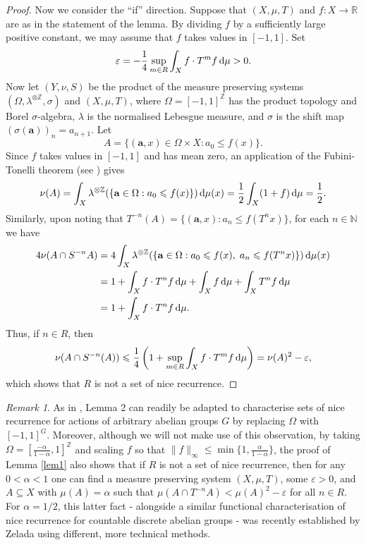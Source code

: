 \documentclass[reqno,a4paper,12pt]{amsart}
\theoremstyle{definition}
\theoremstyle{remark}
\newtheorem*{remark*}{Remark}
\def\d{{\,{\rm d}}}
\def \ba {\mathbf a}
\def \N {\mathbb{N}}
\def \R {\mathbb{R}}
\def \Z {\mathbb{Z}}
\def\eps{\varepsilon}
\begin{document}
\begin{proof}
    Now we consider the ``if'' direction. Suppose that $(X,\mu,T)$ and $f:X\to\R$ are as in the statement of the lemma. By dividing $f$ by a sufficiently large positive constant, we may assume that $f$ takes values in $[-1,1]$. Set
    \begin{equation*}
        \eps = -\frac{1}{4}\sup_{m\in R}\int_X f\cdot T^m f\d\mu > 0.
    \end{equation*}
    Now let $(Y,\nu,S)$ be the product of the measure preserving systems $(\Omega,\lambda^{\otimes\Z},\sigma)$ and $(X,\mu,T)$, where $\Omega = [-1,1]^{\Z}$ has the product topology and Borel $\sigma$-algebra, $\lambda$ is the normalised Lebesgue measure, and $\sigma$ is the shift map $(\sigma(\ba))_n = a_{n+1}$. Let
    \begin{equation*}
       A = \{(\ba,x)\in\Omega\times X: a_0\leqslant f(x)\}.
    \end{equation*}
        Since $f$ takes values in $[-1,1]$ and has mean zero, an application of the Fubini-Tonelli theorem (see \cite[Theorem 1.7.15]{Tao2011}) gives
    \begin{equation*}
        \nu(A) = \int_X \lambda^{\otimes\Z}(\{\ba\in\Omega:a_0\leqslant f(x)\})\d\mu(x) = \frac{1}{2}\int_X(1+f)\d\mu = \frac{1}{2}.
    \end{equation*}
    Similarly, upon noting that $T^{-n}(A) = \{(\ba,x): a_n\leqslant f(T^n x)\}$, for each $n\in\N$ we have
    \begin{align*}
        4\nu(A\cap S^{-n}A) &= 4\int_X \lambda^{\otimes\Z}(\{\ba\in\Omega:a_0\leqslant f(x),\; a_n\leqslant f(T^n x)\})\d\mu(x)\\
        &= 1 + \int_X f\cdot T^n f\d\mu + \int_X f \d\mu + \int_X T^n f\d \mu\\
        &= 1 + \int_X f\cdot T^n f \d\mu.
    \end{align*}
    Thus, if $n\in R$, then
    \begin{equation*}
        \nu(A\cap S^{-n}(A)) \leqslant \frac{1}{4}\left(1 + \sup_{m\in R}\int_X f\cdot T^m f\d\mu \right)= \nu(A)^2 - \eps,
    \end{equation*}
    which shows that $R$ is not a set of nice recurrence.
\end{proof}

\begin{remark*}
As in \cite{BTZ2015}, Lemma 2 can readily be adapted to characterise sets of nice recurrence for actions of arbitrary abelian groups $G$ by replacing $\Omega$ with  $[-1,1]^G$. Moreover, although we will not make use of this observation, by taking $\Omega=[\frac{-\alpha}{1-\alpha},1]^\Z$ and scaling $f$ so that $\lVert f\rVert_\infty\leqslant \min\{1,\frac{\alpha}{1-\alpha}\}$, the proof of Lemma \ref{lem1} also shows that if $R$ is not a set of nice recurrence, then for any $0<\alpha<1$ one can find a measure preserving system $(X,\mu,T)$, some $\eps>0$, and $A\subseteq X$ with $\mu(A)=\alpha $ such that $\mu(A\cap T^{-n}A)<\mu(A)^2 - \eps$ for all $n\in R$. For $\alpha = 1/2$, this latter fact - alongside a similar functional characterisation of nice recurrence for countable discrete abelian groups - was recently established by Zelada \cite[Appendix B]{Zel2026} using different, more technical methods.
\end{remark*}
\end{document}
